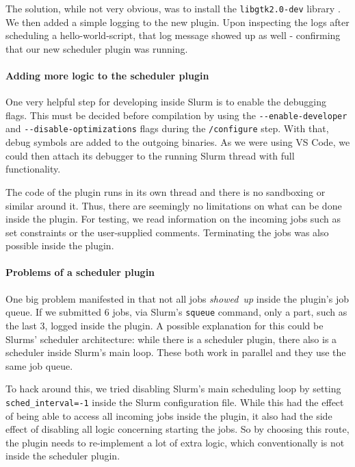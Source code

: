 The solution, while not very obvious, was to install the \verb|libgtk2.0-dev| library .
We then added a simple logging to the new plugin. Upon inspecting the logs after scheduling a hello-world-script, that log message showed up as well - confirming that our new scheduler plugin was running.

\paragraph{Adding more logic to the scheduler plugin}

One very helpful step for developing inside Slurm is to enable the debugging flags.
This must be decided before compilation by using the \verb|--enable-developer| and \verb|--disable-optimizations| flags during the \verb|/configure| step. 
With that, debug symbols are added to the outgoing binaries. 
As we were using VS Code, we could then attach its debugger to the running Slurm thread with full functionality.

The code of the plugin runs in its own thread and there is no sandboxing or similar around it.
Thus, there are seemingly no limitations on what can be done inside the plugin. 
For testing, we read information on the incoming jobs such as set constraints or the user-supplied comments. Terminating the jobs was also possible inside the plugin.

\paragraph{Problems of a scheduler plugin}

One big problem manifested in that not all jobs \emph{showed~up} inside the plugin's job queue. 
If we submitted 6 jobs, via Slurm's \verb|squeue| command, only a part, such as the last 3, logged inside the plugin.
A possible explanation for this could be Slurms' scheduler architecture: while there is a scheduler plugin, there also is a scheduler inside Slurm's main loop. These both work in parallel  and they use the same job queue.

To hack around this, we tried disabling Slurm's main scheduling loop by setting \verb|sched_interval=-1| inside the Slurm configuration file. 
While this had the effect of being able to access all incoming jobs inside the plugin, it also had the side effect of disabling all logic concerning starting the jobs.
So by choosing this route, the plugin needs to re-implement a lot of extra logic, which conventionally is not inside the scheduler plugin. 

